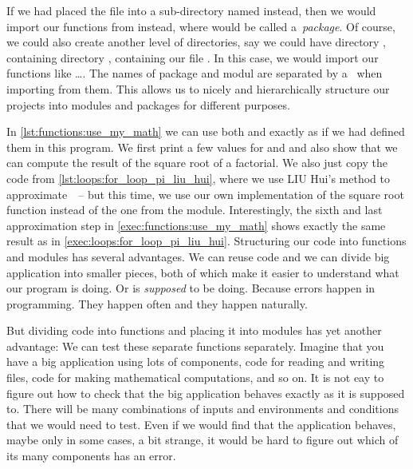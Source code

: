 If we had placed the  file into a sub-directory named  instead, then we would import our functions from  instead, where  would be called a~\emph{package}.
Of course, we could also create another level of directories, say we could have directory , containing directory , containing our file .
In this case, we would import our functions like \dots.
The names of package and modul are separated by a~ when importing from them.
This allows us to nicely and hierarchically structure our projects into modules and packages for different purposes.

In \cref{lst:functions:use_my_math} we can use both  and  exactly as if we had defined them in this program.
We first print a few values for  and  and also show that we can compute the result of the square root of a factorial.
We also just copy the code from \cref{lst:loops:for_loop_pi_liu_hui}, where we use LIU Hui's method to approximate~\numberPi\ -- but this time, we use our own implementation of the square root function instead of the one from the  module.
Interestingly, the sixth and last approximation step in \cref{exec:functions:use_my_math} shows exactly the same result as in \cref{exec:loops:for_loop_pi_liu_hui}.%
%
\FloatBarrier%
\endhsection%
%
%
\label{sec:unitTesting}%
%
Structuring our code into functions and modules has several advantages.
We can reuse code and we can divide big application into smaller pieces, both of which make it easier to understand what our program is doing.
Or is \emph{supposed} to be doing.
Because errors happen in programming.
They happen often and they happen naturally.

But dividing code into functions and placing it into modules has yet another advantage:
We can test these separate functions separately.
Imagine that you have a big application using lots of components, code for reading and writing files, code for making mathematical computations, and so on.
It is not eay to figure out how to check that the big application behaves exactly as it is supposed to.
There will be many combinations of inputs and environments and conditions that we would need to test.
Even if we would find that the application behaves, maybe only in some cases, a bit strange, it would be hard to figure out which of its many components has an error.

